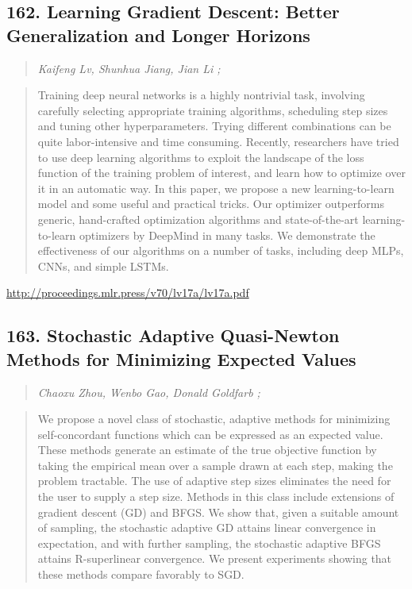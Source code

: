 \documentclass{article}
\begin{document}
\subsection{162. Learning Gradient Descent: Better Generalization and Longer Horizons}

\begin{quote}
\footnotesize{\textit{Kaifeng Lv, Shunhua Jiang, Jian Li ;}}
\end{quote}

\begin{quote}
    Training deep neural networks is a highly nontrivial task, involving carefully selecting appropriate training algorithms, scheduling step sizes and tuning other hyperparameters. Trying different combinations can be quite labor-intensive and time consuming. Recently, researchers have tried to use deep learning algorithms to exploit the landscape of the loss function of the training problem of interest, and learn how to optimize over it in an automatic way. In this paper, we propose a new learning-to-learn model and some useful and practical tricks. Our optimizer outperforms generic, hand-crafted optimization algorithms and state-of-the-art learning-to-learn optimizers by DeepMind in many tasks. We demonstrate the effectiveness of our algorithms on a number of tasks, including deep MLPs, CNNs, and simple LSTMs.  \end{quote}

\href{http://proceedings.mlr.press/v70/lv17a/lv17a.pdf}{http://proceedings.mlr.press/v70/lv17a/lv17a.pdf}

\subsection{163. Stochastic Adaptive Quasi-Newton Methods for Minimizing Expected Values}

\begin{quote}
\footnotesize{\textit{Chaoxu Zhou, Wenbo Gao, Donald Goldfarb ;}}
\end{quote}

\begin{quote}
    We propose a novel class of stochastic, adaptive methods for minimizing self-concordant functions which can be expressed as an expected value. These methods generate an estimate of the true objective function by taking the empirical mean over a sample drawn at each step, making the problem tractable. The use of adaptive step sizes eliminates the need for the user to supply a step size. Methods in this class include extensions of gradient descent (GD) and BFGS. We show that, given a suitable amount of sampling, the stochastic adaptive GD attains linear convergence in expectation, and with further sampling, the stochastic adaptive BFGS attains R-superlinear convergence. We present experiments showing that these methods compare favorably to SGD.  \end{quote}
\end{document}
